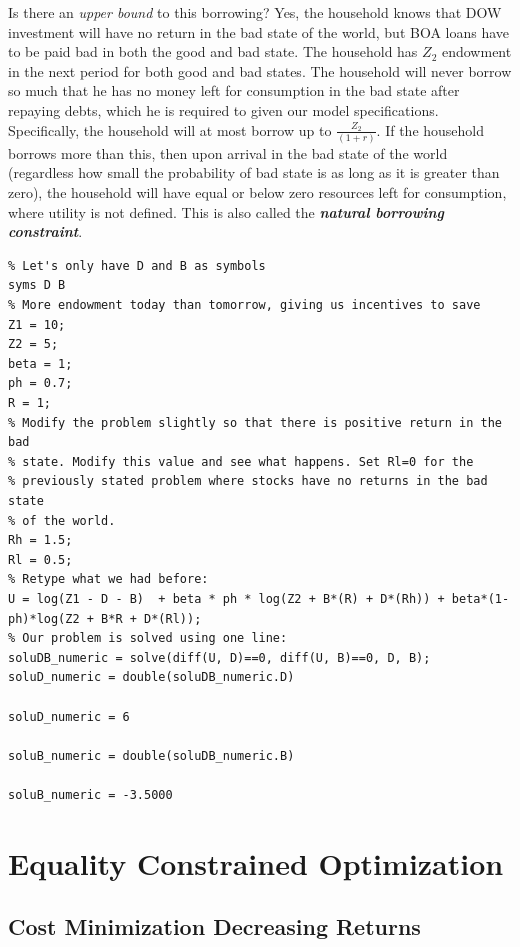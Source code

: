 \documentclass[
]{book}
\begin{document}
Is there an \emph{upper bound} to this borrowing? Yes, the household knows
that DOW investment will have no return in the bad state of the world,
but BOA loans have to be paid bad in both the good and bad state. The
household has \(Z_2\) endowment in the next period for both good and bad
states. The household will never borrow so much that he has no money
left for consumption in the bad state after repaying debts, which he is
required to given our model specifications. Specifically, the household
will at most borrow up to \(\frac{Z_2 }{(1+r)}\). If the household borrows
more than this, then upon arrival in the bad state of the world
(regardless how small the probability of bad state is as long as it is
greater than zero), the household will have equal or below zero
resources left for consumption, where utility is not defined. This is
also called the \textbf{\emph{natural borrowing constraint}}.

\begin{verbatim}
% Let's only have D and B as symbols
syms D B 
% More endowment today than tomorrow, giving us incentives to save
Z1 = 10;
Z2 = 5;
beta = 1;
ph = 0.7;
R = 1;
% Modify the problem slightly so that there is positive return in the bad
% state. Modify this value and see what happens. Set Rl=0 for the
% previously stated problem where stocks have no returns in the bad state
% of the world.
Rh = 1.5;
Rl = 0.5;
% Retype what we had before:
U = log(Z1 - D - B)  + beta * ph * log(Z2 + B*(R) + D*(Rh)) + beta*(1-ph)*log(Z2 + B*R + D*(Rl));
% Our problem is solved using one line:
soluDB_numeric = solve(diff(U, D)==0, diff(U, B)==0, D, B);
soluD_numeric = double(soluDB_numeric.D)

soluD_numeric = 6

soluB_numeric = double(soluDB_numeric.B)

soluB_numeric = -3.5000
\end{verbatim}

\hypertarget{equality-constrained-optimization}{%
\chapter{Equality Constrained Optimization}\label{equality-constrained-optimization}}

\hypertarget{cost-minimization-decreasing-returns}{%
\section{Cost Minimization Decreasing Returns}\label{cost-minimization-decreasing-returns}}
\end{document}
